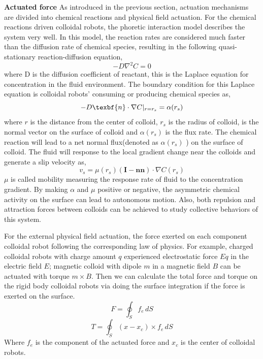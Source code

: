 \textbf{Actuated force} As introduced in the previous section, actuation mechanisms are divided into chemical reactions and physical field actuation. For the chemical reactions driven colloidal robots, the phoretic interaction  model describes the system very well. \autocite{golestanian2007,najafi2004simple,golestanian2005propulsion,golestanian2019phoretic} In this model, the reaction rates are considered much faster than the diffusion rate of chemical species, resulting in the following   
quasi-stationary reaction-diffusion equation,
\begin{equation}
    -D\nabla^2 C=0
\end{equation}
where D is the diffusion coefficient of reactant, this is the Laplace equation for concentration in the fluid environment. The boundary condition for this Laplace equation is  colloidal robots' consuming or producing chemical species as,
\begin{equation}
    -D \texbf{n}\cdot \nabla C|_{r=r_s}=\alpha(r_s)
\end{equation}
where $r$ is the distance from the center of colloid, $r_s$ is the radius of colloid,  is the normal vector on the surface of colloid and $\alpha(r_s)$ is the flux rate. The chemical reaction will lead to a net normal flux(denoted as $\alpha(r_s)$ ) on the surface of colloid. The fluid will response to the local gradient change near the colloids and generate a slip velocity as,
\begin{equation}
    v_s=\mu(r_s)(\textbf{I}-\textbf{n}\textbf{n})\cdot \nabla C(r_s)
\end{equation}
$\mu$ is called mobility measuring the response rate of fluid to the concentration gradient. By making $\alpha$ and $\mu$ positive or negative, the asymmetric chemical activity on the surface can lead to autonomous motion.  Also, both repulsion and attraction forces between colloids can be achieved to study collective behaviors of this system. \autocite{michelin2015autophoretic}

For the external physical field actuation, the force exerted on each component colloidal robot following the corresponding law of physics. For example, charged colloidal robots with charge amount $q$ experienced electrostatic force $Eq$ in the electric field $E$; magnetic colloid with dipole $m$ in a magnetic field $B$ can be actuated with torque $m\times B$.
Then we can calculate the total force and torque on the rigid body colloidal robots via doing the surface integration if the force is exerted on the surface.
\begin{equation}
    F=\oint_S f_e \,dS
\end{equation}
\begin{equation}
    T=\oint_S (x-x_c)\times f_e \,dS
\end{equation}
Where $f_e$  is the component of the actuated force and $x_c$ is the center of colloidal robots.

